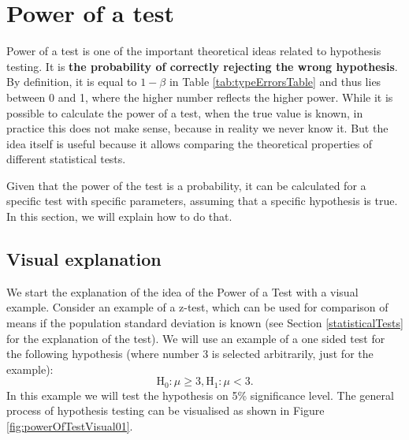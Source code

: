 \documentclass[
]{book}
\theoremstyle{definition}
\theoremstyle{definition}
\theoremstyle{definition}
\theoremstyle{definition}
\theoremstyle{remark}
\begin{document}
\hypertarget{powerOfTheTest}{%
\section{Power of a test}\label{powerOfTheTest}}

Power of a test is one of the important theoretical ideas related to hypothesis testing. It is \textbf{the probability of correctly rejecting the wrong hypothesis}. By definition, it is equal to \(1-\beta\) in Table \ref{tab:typeErrorsTable} and thus lies between 0 and 1, where the higher number reflects the higher power. While it is possible to calculate the power of a test, when the true value is known, in practice this does not make sense, because in reality we never know it. But the idea itself is useful because it allows comparing the theoretical properties of different statistical tests.

Given that the power of the test is a probability, it can be calculated for a specific test with specific parameters, assuming that a specific hypothesis is true. In this section, we will explain how to do that.

\hypertarget{visual-explanation}{%
\subsection{Visual explanation}\label{visual-explanation}}

We start the explanation of the idea of the Power of a Test with a visual example. Consider an example of a z-test, which can be used for comparison of means if the population standard deviation is known (see Section \ref{statisticalTests} for the explanation of the test). We will use an example of a one sided test for the following hypothesis (where number 3 is selected arbitrarily, just for the example):
\begin{equation}
    \mathrm{H}_0: \mu \geq 3, \mathrm{H}_1: \mu < 3.
    \label{eq:powerOfATestHypothesis}
\end{equation}
In this example we will test the hypothesis on 5\% significance level. The general process of hypothesis testing can be visualised as shown in Figure \ref{fig:powerOfTestVisual01}.
\end{document}
